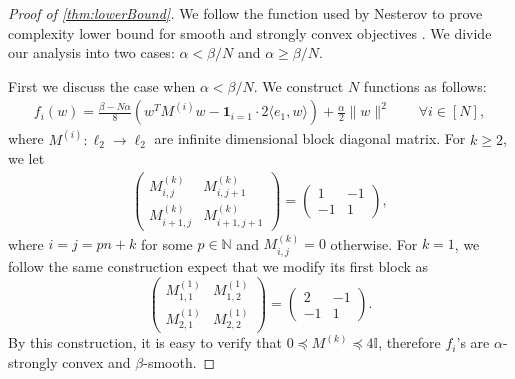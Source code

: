 \begin{proof}[Proof of \autoref{thm:lowerBound}]
    We follow the function used by Nesterov to prove complexity lower bound for smooth and strongly convex objectives \citep{nemirovsky1983problem,cvxopt_lecture,Bubeck15}. We divide our analysis into two cases: $\alpha < \beta/N$ and $\alpha \geq \beta/N$. 
    
    First we discuss the case when $\alpha < \beta/N$. We construct $N$ functions as follows:
    \begin{align}
        f_i( w ) = \frac{\beta - N \alpha}{8} \left( w^T M^{(i)} w - \mathbf{1}_{i=1} \cdot 2 \langle e_1, w \rangle \right) + \frac{\alpha}{2} \| w \|^2 \qquad \forall i \in [N],
    \end{align}
    where $M^{(i)} : \ell_2 \to \ell_2 $ are infinite dimensional block diagonal matrix. For $k \geq 2$, we let
    \begin{align}
        \begin{pmatrix}
            M^{(k)}_{i,j} & M^{(k)}_{i,j+1} \\
            M^{(k)}_{i+1,j} & M^{(k)}_{i+1,j+1}
        \end{pmatrix}
        = 
        \begin{pmatrix}
            1 & -1 \\
            -1 & 1
        \end{pmatrix},
    \end{align}
    where $i =j = pn+k$ for some $p \in \mathbb{N}$ and $M^{(k)}_{i,j} = 0$ otherwise. For $k=1$, we follow the same construction expect that we modify its first block as
    \[
        \begin{pmatrix}
            M^{(1)}_{1,1} & M^{(1)}_{1,2} \\
            M^{(1)}_{2,1} & M^{(1)}_{2,2}
        \end{pmatrix}
        = 
        \begin{pmatrix}
            2 & -1 \\
            -1 & 1
        \end{pmatrix}.
    \]
    By this construction, it is easy to verify that $ 0 \preceq M^{(k)} \preceq 4 \mathbb{I}$, therefore $f_i$'s are $\alpha$-strongly convex and $\beta$-smooth.
    

\end{proof}
